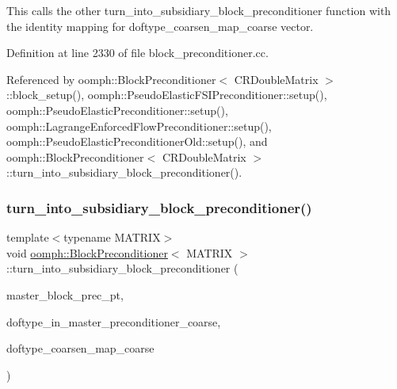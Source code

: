 This calls the other turn\+\_\+into\+\_\+subsidiary\+\_\+block\+\_\+preconditioner function with the identity mapping for doftype\+\_\+coarsen\+\_\+map\+\_\+coarse vector. 

Definition at line 2330 of file block\+\_\+preconditioner.\+cc.



Referenced by oomph\+::\+Block\+Preconditioner$<$ C\+R\+Double\+Matrix $>$\+::block\+\_\+setup(), oomph\+::\+Pseudo\+Elastic\+F\+S\+I\+Preconditioner\+::setup(), oomph\+::\+Pseudo\+Elastic\+Preconditioner\+::setup(), oomph\+::\+Lagrange\+Enforced\+Flow\+Preconditioner\+::setup(), oomph\+::\+Pseudo\+Elastic\+Preconditioner\+Old\+::setup(), and oomph\+::\+Block\+Preconditioner$<$ C\+R\+Double\+Matrix $>$\+::turn\+\_\+into\+\_\+subsidiary\+\_\+block\+\_\+preconditioner().

\mbox{\label{classoomph_1_1BlockPreconditioner_ae9282acaaf19fa2cdb703d49f1a8de25}} 
\subsubsection{\texorpdfstring{turn\+\_\+into\+\_\+subsidiary\+\_\+block\+\_\+preconditioner()}{turn\_into\_subsidiary\_block\_preconditioner()}\hspace{0.1cm}{\footnotesize\ttfamily [2/2]}}
{\footnotesize\ttfamily template$<$typename M\+A\+T\+R\+IX$>$ \\
void \hyperlink{classoomph_1_1BlockPreconditioner}{oomph\+::\+Block\+Preconditioner}$<$ M\+A\+T\+R\+IX $>$\+::turn\+\_\+into\+\_\+subsidiary\+\_\+block\+\_\+preconditioner (\begin{DoxyParamCaption}\item[{\hyperlink{classoomph_1_1BlockPreconditioner}{Block\+Preconditioner}$<$ M\+A\+T\+R\+IX $>$ $\ast$}]{master\+\_\+block\+\_\+prec\+\_\+pt,  }\item[{const \hyperlink{classoomph_1_1Vector}{Vector}$<$ unsigned $>$ \&}]{doftype\+\_\+in\+\_\+master\+\_\+preconditioner\+\_\+coarse,  }\item[{const \hyperlink{classoomph_1_1Vector}{Vector}$<$ \hyperlink{classoomph_1_1Vector}{Vector}$<$ unsigned $>$ $>$ \&}]{doftype\+\_\+coarsen\+\_\+map\+\_\+coarse }\end{DoxyParamCaption})}



